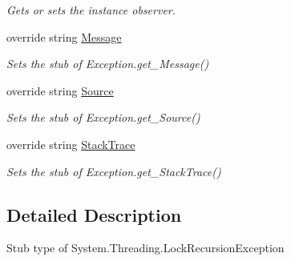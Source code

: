 \begin{DoxyCompactItemize}
\begin{DoxyCompactList}\small\item\em Gets or sets the instance observer.\end{DoxyCompactList}\item 
override string \hyperlink{class_system_1_1_threading_1_1_fakes_1_1_stub_lock_recursion_exception_a16b7438b4d03fa910bfee95df68cd4a8}{Message}
\begin{DoxyCompactList}\small\item\em Sets the stub of Exception.\-get\-\_\-\-Message()\end{DoxyCompactList}\item 
override string \hyperlink{class_system_1_1_threading_1_1_fakes_1_1_stub_lock_recursion_exception_aa19e449ed19bd048efd68e5d48a51442}{Source}
\begin{DoxyCompactList}\small\item\em Sets the stub of Exception.\-get\-\_\-\-Source()\end{DoxyCompactList}\item 
override string \hyperlink{class_system_1_1_threading_1_1_fakes_1_1_stub_lock_recursion_exception_abc8b442973fd3f5e7983f0acd391172e}{Stack\-Trace}
\begin{DoxyCompactList}\small\item\em Sets the stub of Exception.\-get\-\_\-\-Stack\-Trace()\end{DoxyCompactList}\end{DoxyCompactItemize}


\subsection{Detailed Description}
Stub type of System.\-Threading.\-Lock\-Recursion\-Exception



